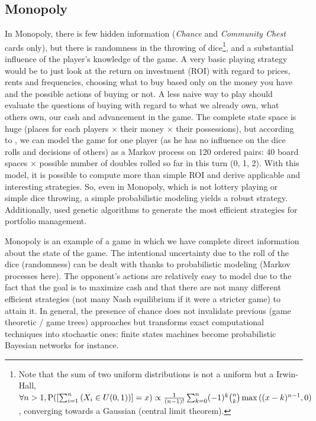 \subsection{Monopoly}
In Monopoly, there is few hidden information (\textit{Chance} and \textit{Community Chest} cards only), but there is randomness in the throwing of dice\footnote{Note that the sum of two uniform distributions is not a uniform but a Irwin-Hall, $\forall n>1, \mathrm{P}([\sum_{i=1}^n{(X_i\in U(0,1))}]=x) \propto \frac{1}{(n-1)!}\sum_{k=0}^n(-1)^k{n\choose k}\max{((x-k)^{n-1},0)}$, converging towards a Gaussian (central limit theorem).}, and a substantial influence of the player's knowledge of the game. A very basic playing strategy would be to just look at the return on investment (ROI) with regard to prices, rents and frequencies, choosing what to buy based only on the money you have and the possible actions of buying or not. A less naive way to play should evaluate the questions of buying with regard to what we already own, what others own, our cash and advancement in the game. The complete state space is huge (places for each players $\times$ their money $\times$ their possessions), but according to \cite{MonopolyMarkov}, we can model the game for one player (as he has no influence on the dice rolls and decisions of others) as a Markov process on 120 ordered pairs: 40 board spaces $\times$ possible number of doubles rolled so far in this turn (0, 1, 2). With this model, it is possible to compute more than simple ROI and derive applicable and interesting strategies. So, even in Monopoly, which is not lottery playing or simple dice throwing, a simple probabilistic modeling yields a robust strategy. Additionally, \cite{MonopolyFrayn05} used genetic algorithms to generate the most efficient strategies for portfolio management. %

Monopoly is an example of a game in which we have complete direct information about the state of the game. The intentional uncertainty due to the roll of the dice (randomness) can be dealt with thanks to probabilistic modeling (Markov processes here). The opponent's actions are relatively easy to model due to the fact that the goal is to maximize cash and that there are not many different efficient strategies (not many Nash equilibrium if it were a stricter game) to attain it. In general, the presence of chance does not invalidate previous (game theoretic / game trees) approaches but transforms exact computational techniques into stochastic ones: finite states machines become probabilistic Bayesian networks for instance.

